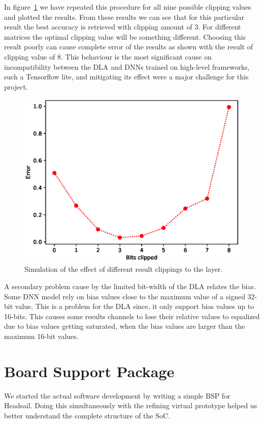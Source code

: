 \documentclass[12pt,a4paper,english
]{tunithesis}
\begin{document}
In figure~\ref{fig:clipping} we have repeated this procedure for all nine possible clipping values and plotted the results. From these results we can see that for this particular result the best accuracy is retrieved with clipping amount of 3. For different matrices the optimal clipping value will be something different. Choosing this result poorly can cause complete error of the results as shown with the result of clipping value of 8.
This behaviour is the most significant cause on incompatibility between the DLA and DNNs trained on high-level frameworks, such a Tensorflow lite, and mitigating its effect were a major challenge for this project.

\begin{figure}
  \centering
  \includegraphics[width=0.85\linewidth]{img/clipping.eps}
  \caption{Simulation of the effect of different result clippings to the layer.}
  \label{fig:clipping}
\end{figure}

A secondary problem cause by the limited bit-width of the DLA relates the bias. Some DNN model rely on bias values close to the maximum value of a signed 32-bit value. This is a problem for the DLA since, it only support bias values up to 16-bits. This causes some results channels to lose their relative values to equalized due to bias values getting saturated, when the bias values are larger than the maximum 16-bit values.

\section{Board Support Package}
\label{sec:software_support}
We started the actual software development by writing a simple BSP for Headsail. Doing this simultaneously with the refining virtual prototype helped us better understand the complete structure of the SoC.
\end{document}
